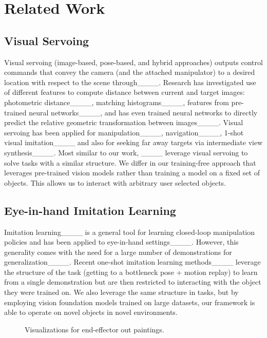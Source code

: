 \section{Related Work}




\subsection{Visual Servoing}
Visual servoing (image-based,
pose-based, and hybrid approaches) outputs
control commands that convey the camera (and the attached manipulator) to a
desired location with respect to the scene through____.  Research has investigated use of
different features to compute distance between current and target images:
photometric distance____, matching
histograms____, features from pre-trained neural
networks____, and has even trained neural networks to
directly predict the relative geometric transformation between
images____. Visual servoing has been applied for 
manipulation____, 
navigation____, 
1-shot visual imitation____ and also for
seeking far away targets via intermediate view 
synthesis____. Most similar to our work, ____ leverage visual servoing to solve tasks 
with a similar structure. We differ in our training-free approach
that leverages pre-trained vision models rather than training a model
on a fixed set of objects. This allows us to interact with arbitrary user selected objects.


\subsection{Eye-in-hand Imitation Learning}
Imitation learning____ is a
general tool for learning closed-loop manipulation policies and has been
applied to eye-in-hand settings____.
However, this generality comes with the
need for a large number of demonstrations for
generalization____. Recent one-shot imitation learning
methods____ %
leverage the structure of the task (getting to a bottleneck pose + motion
replay) to learn from a single demonstration but are then restricted to
interacting with the object they were trained on. We also leverage the same
structure in tasks, but by employing vision foundation models
trained on large datasets, our framework is able
to operate on novel objects in novel environments.

\begin{figure}
\setlength{\tabcolsep}{2pt}
\caption{Visualizations for end-effector out paintings.}
\end{figure}

